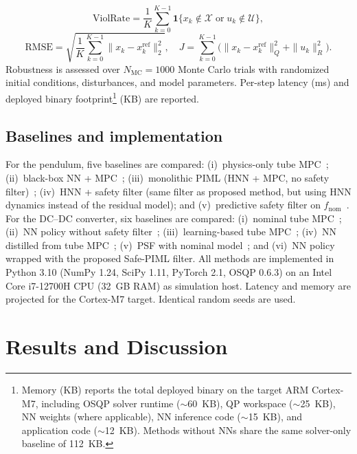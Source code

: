 \documentclass[12pt,a4paper]{article}
\begin{document}
\begin{equation}
  \text{ViolRate} = \frac{1}{K}\sum_{k=0}^{K-1}
    \mathbf{1}\{x_k\notin\mathcal{X}\;\text{or}\;u_k\notin\mathcal{U}\},
    \label{eq:violrate}
\end{equation}
\begin{equation}
  \text{RMSE} = \sqrt{\frac{1}{K}\sum_{k=0}^{K-1}
    \|x_k - x_k^{\mathrm{ref}}\|_2^2}, \quad
  J = \sum_{k=0}^{K-1}
    \bigl(\|x_k{-}x_k^{\mathrm{ref}}\|_Q^2 {+} \|u_k\|_R^2\bigr).
    \label{eq:rmse-cost}
\end{equation}
Robustness is assessed over $N_{\mathrm{MC}}=1000$ Monte Carlo trials
with randomized initial conditions, disturbances, and model parameters.
Per-step latency (ms) and deployed binary footprint\footnote{%
  Memory (KB) reports the total deployed binary on the target ARM
  Cortex-M7, including OSQP solver runtime ($\sim$60~KB), QP workspace
  ($\sim$25~KB), NN weights (where applicable), NN inference code
  ($\sim$15~KB), and application code ($\sim$12~KB). Methods without NNs
  share the same solver-only baseline of 112~KB.} (KB) are reported.

\subsection{Baselines and implementation}
\label{subsec:baselines}

For the pendulum, five baselines are compared:
(i)~physics-only tube MPC~\cite{mayne2005robust};
(ii)~black-box NN + MPC~\cite{nghiem2023piml};
(iii)~monolithic PIML (HNN + MPC, no safety
filter)~\cite{greydanus2019hnn};
(iv)~HNN + safety filter (same filter as proposed method, but using HNN
dynamics instead of the residual model);
and (v)~predictive safety filter on
$f_{\mathrm{nom}}$~\cite{wabersich2021psf}.
For the DC--DC converter, six baselines are compared:
(i)~nominal tube MPC~\cite{mayne2005robust};
(ii)~NN policy without safety filter~\cite{schwan2023evanqp};
(iii)~learning-based tube MPC~\cite{gao2024rigid};
(iv)~NN distilled from tube MPC~\cite{tagliabue2022gps};
(v)~PSF with nominal model~\cite{wabersich2021psf};
and (vi)~NN policy wrapped with the proposed Safe-PIML filter.
All methods are implemented in Python 3.10 (NumPy 1.24, SciPy 1.11,
PyTorch 2.1, OSQP 0.6.3) on an Intel Core i7-12700H CPU (32~GB RAM)
as simulation host. Latency and memory are projected for the Cortex-M7
target. Identical random seeds are used.

\section{Results and Discussion}
\label{sec:results}
\end{document}
